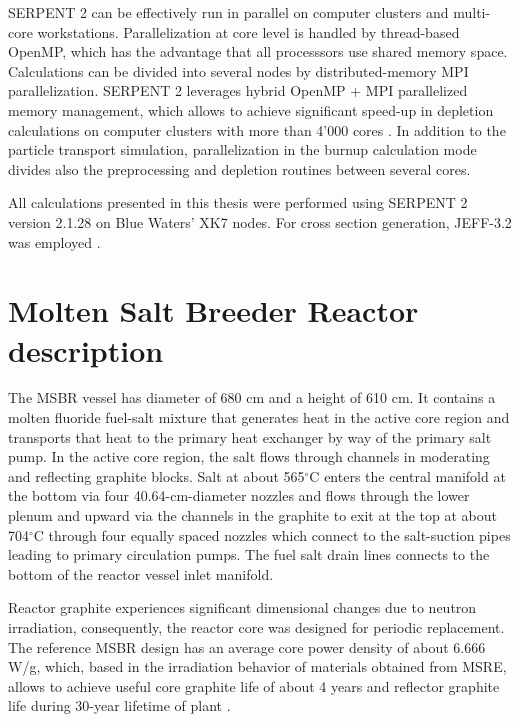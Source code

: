 SERPENT 2 can be effectively run in parallel on computer clusters and multi-core workstations. Parallelization at core level is handled by thread-based OpenMP, which has the advantage that all processsors use shared memory space. Calculations can be divided into several nodes by distributed-memory MPI parallelization. SERPENT 2 leverages hybrid OpenMP + MPI parallelized memory management, which allows to achieve significant speed-up in depletion calculations on computer clusters with more than 4'000 cores \cite{leppanen_serpent_2015-1}. In addition to the particle transport simulation, parallelization in the burnup calculation mode divides also the preprocessing and depletion routines between several cores.

All calculations presented in this thesis were performed using SERPENT 2 version 
2.1.28 on Blue Waters’ XK7 nodes. For cross section generation, JEFF-3.2 was employed \cite{oecd/nea_data_bank_jeff-3.2_2014}.

\section{Molten Salt Breeder Reactor description}

The \gls{MSBR} vessel has diameter of 680 cm and a height of 610 cm. It 
contains a molten fluoride fuel-salt mixture that generates heat in the active 
core region and transports that heat to the primary heat exchanger by way of 
the primary salt pump. In the active core region, the salt flows through channels in moderating and reflecting graphite blocks. Salt at about 565$^{\circ}$C enters the central manifold at the bottom via four 40.64-cm-diameter nozzles and flows through 
the lower plenum and upward via the channels in the graphite to exit at the top at about 704$^{\circ}$C through four equally spaced nozzles which connect to the salt-suction pipes leading to primary circulation pumps. The fuel salt drain lines connects to the bottom of the reactor vessel inlet manifold.

Reactor graphite experiences significant dimensional changes due to neutron irradiation, consequently, the reactor core was designed for periodic replacement. The reference \gls{MSBR} design has an average core power density of about 6.666 W/g, which, based in the irradiation behavior of materials obtained from \gls{MSRE}, allows to achieve useful core graphite life of about 4 years and reflector graphite 	life during 30-year lifetime of plant \cite{robertson_conceptual_1971}.

